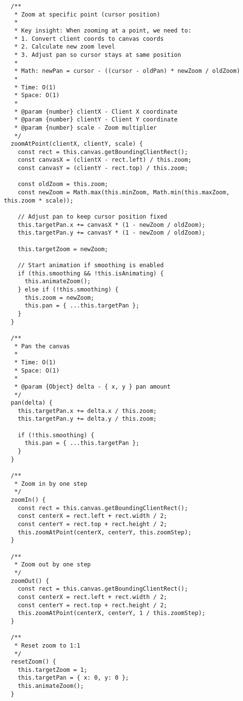 \documentclass[11pt]{article}
\begin{document}
\begin{verbatim}
  /**
   * Zoom at specific point (cursor position)
   * 
   * Key insight: When zooming at a point, we need to:
   * 1. Convert client coords to canvas coords
   * 2. Calculate new zoom level
   * 3. Adjust pan so cursor stays at same position
   * 
   * Math: newPan = cursor - ((cursor - oldPan) * newZoom / oldZoom)
   * 
   * Time: O(1)
   * Space: O(1)
   * 
   * @param {number} clientX - Client X coordinate
   * @param {number} clientY - Client Y coordinate
   * @param {number} scale - Zoom multiplier
   */
  zoomAtPoint(clientX, clientY, scale) {
    const rect = this.canvas.getBoundingClientRect();
    const canvasX = (clientX - rect.left) / this.zoom;
    const canvasY = (clientY - rect.top) / this.zoom;
    
    const oldZoom = this.zoom;
    const newZoom = Math.max(this.minZoom, Math.min(this.maxZoom, this.zoom * scale));
    
    // Adjust pan to keep cursor position fixed
    this.targetPan.x += canvasX * (1 - newZoom / oldZoom);
    this.targetPan.y += canvasY * (1 - newZoom / oldZoom);
    
    this.targetZoom = newZoom;
    
    // Start animation if smoothing is enabled
    if (this.smoothing && !this.isAnimating) {
      this.animateZoom();
    } else if (!this.smoothing) {
      this.zoom = newZoom;
      this.pan = { ...this.targetPan };
    }
  }
  
  /**
   * Pan the canvas
   * 
   * Time: O(1)
   * Space: O(1)
   * 
   * @param {Object} delta - { x, y } pan amount
   */
  pan(delta) {
    this.targetPan.x += delta.x / this.zoom;
    this.targetPan.y += delta.y / this.zoom;
    
    if (!this.smoothing) {
      this.pan = { ...this.targetPan };
    }
  }
  
  /**
   * Zoom in by one step
   */
  zoomIn() {
    const rect = this.canvas.getBoundingClientRect();
    const centerX = rect.left + rect.width / 2;
    const centerY = rect.top + rect.height / 2;
    this.zoomAtPoint(centerX, centerY, this.zoomStep);
  }
  
  /**
   * Zoom out by one step
   */
  zoomOut() {
    const rect = this.canvas.getBoundingClientRect();
    const centerX = rect.left + rect.width / 2;
    const centerY = rect.top + rect.height / 2;
    this.zoomAtPoint(centerX, centerY, 1 / this.zoomStep);
  }
  
  /**
   * Reset zoom to 1:1
   */
  resetZoom() {
    this.targetZoom = 1;
    this.targetPan = { x: 0, y: 0 };
    this.animateZoom();
  }
  

\end{verbatim}
\end{document}
